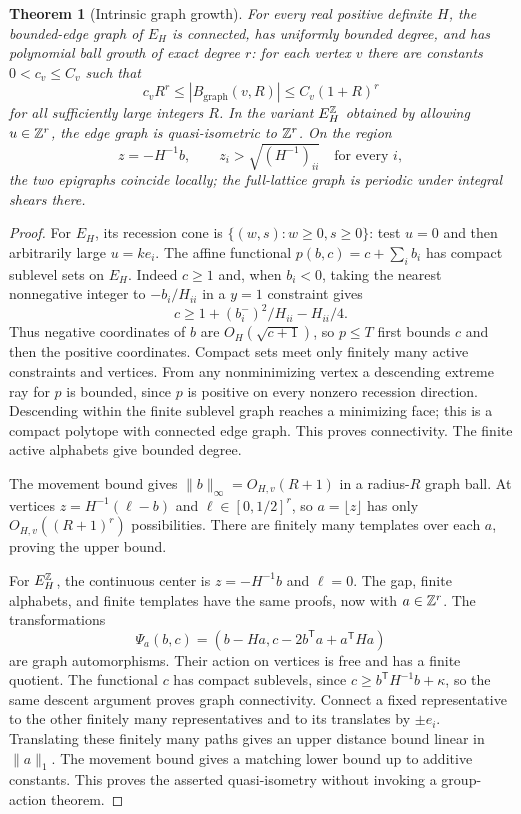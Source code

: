 \documentclass[11pt]{article}
\newtheorem{theorem}{Theorem}[section]
\theoremstyle{definition}\newtheorem{definition}[theorem]{Definition}
\theoremstyle{remark}\newtheorem{remark}[theorem]{Remark}
\newcommand{\T}{^{\mathsf T}}\newcommand{\norm}[1]{\lVert #1\rVert}
\begin{document}
\begin{theorem}[Intrinsic graph growth]\label{thm:growth}
For every real positive definite $H$, the bounded-edge graph of $E_H$ is connected, has uniformly bounded degree, and has polynomial ball growth of exact degree $r$: for each vertex $v$ there are constants $0<c_v\le C_v$ such that
\[
 c_vR^r\le |B_{\mathrm{graph}}(v,R)|\le C_v(1+R)^r
\]
for all sufficiently large integers $R$. In the variant $E_H^{\mathbb Z}$ obtained by allowing $u\in\mathbb Z^r$, the edge graph is quasi-isometric to $\mathbb Z^r$. On the region
\[
 z=-H^{-1}b,\qquad z_i>\sqrt{(H^{-1})_{ii}}\quad\text{for every }i,
\]
the two epigraphs coincide locally; the full-lattice graph is periodic under integral shears there.
\end{theorem}
\begin{proof}
For $E_H$, its recession cone is $\{(w,s):w\ge0,s\ge0\}$: test $u=0$ and then arbitrarily large $u=ke_i$. The affine functional $p(b,c)=c+\sum_i b_i$ has compact sublevel sets on $E_H$. Indeed $c\ge1$ and, when $b_i<0$, taking the nearest nonnegative integer to $-b_i/H_{ii}$ in a $y=1$ constraint gives
\[
 c\ge1+(b_i^-)^2/H_{ii}-H_{ii}/4.
\]
Thus negative coordinates of $b$ are $O_H(\sqrt{c+1})$, so $p\le T$ first bounds $c$ and then the positive coordinates. Compact sets meet only finitely many active constraints and vertices. From any nonminimizing vertex a descending extreme ray for $p$ is bounded, since $p$ is positive on every nonzero recession direction. Descending within the finite sublevel graph reaches a minimizing face; this is a compact polytope with connected edge graph. This proves connectivity. The finite active alphabets give bounded degree.

The movement bound gives $\norm b_\infty=O_{H,v}(R+1)$ in a radius-$R$ graph ball. At vertices $z=H^{-1}(\ell-b)$ and $\ell\in[0,1/2]^r$, so $a=\lfloor z\rfloor$ has only $O_{H,v}((R+1)^r)$ possibilities. There are finitely many templates over each $a$, proving the upper bound.

For $E_H^{\mathbb Z}$, the continuous center is $z=-H^{-1}b$ and $\ell=0$. The gap, finite alphabets, and finite templates have the same proofs, now with $a\in\mathbb Z^r$. The transformations
\[
 \Psi_a(b,c)=(b-Ha,c-2b\T a+a\T Ha)
\]
are graph automorphisms. Their action on vertices is free and has a finite quotient. The functional $c$ has compact sublevels, since $c\ge b\T H^{-1}b+\kappa$, so the same descent argument proves graph connectivity. Connect a fixed representative to the other finitely many representatives and to its translates by $\pm e_i$. Translating these finitely many paths gives an upper distance bound linear in $\norm a_1$. The movement bound gives a matching lower bound up to additive constants. This proves the asserted quasi-isometry without invoking a group-action theorem.


\end{proof}
\end{document}
